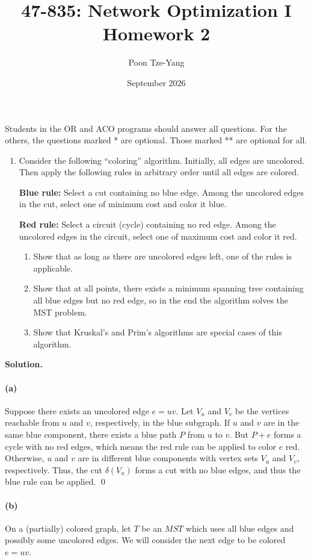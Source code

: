 \documentclass[11pt,letterpaper]{article}
\title{47-835: Network Optimization I \\ Homework 2}
\author{Poon Tze-Yang}
\date{September 2026}
\theoremstyle{definition}
\newcommand{\solution}{\medskip\noindent\textbf{Solution.}\par\medskip}
\begin{document}
\maketitle

Students in the OR and ACO programs should answer all questions. For the others, the questions marked * are optional. Those marked ** are optional for all.

\begin{enumerate}[series=q]
\item Consider the following ``coloring'' algorithm. Initially, all edges are uncolored. Then apply the following rules in arbitrary order until all edges are colored.

\noindent \textbf{Blue rule:} Select a cut containing no blue edge. Among the uncolored edges in the cut, select one of minimum cost and color it blue.

\noindent \textbf{Red rule:} Select a circuit (cycle) containing no red edge. Among the uncolored edges in the circuit, select one of maximum cost and color it red.
\begin{enumerate}
\item Show that as long as there are uncolored edges left, one of the rules is applicable.
\item Show that at all points, there exists a minimum spanning tree containing all blue edges but no red edge, so in the end the algorithm solves the MST problem.
\item Show that Kruskal's and Prim's algorithms are special cases of this algorithm.
\end{enumerate}
\end{enumerate}

\solution
 
\paragraph{(a)}
Suppose there exists an uncolored edge $e=uv$. 
Let $V_u$ and $V_v$ be the vertices reachable from $u$ and $v$, respectively, in the blue subgraph.
If $u$ and $v$ are in the same blue component, there exists a blue path $P$ from $u$ to $v$. 
But $P+e$ forms a cycle with no red edges, which means the red rule can be applied to color $e$ red.
Otherwise, $u$ and $v$ are in different blue components with vertex sets $V_u$ and $V_v$, respectively. 
Thus, the cut $\delta(V_u)$ forms a cut with no blue edges, and thus the blue rule can be applied.
\qed

\paragraph{(b)}
On a (partially) colored graph, let $T$ be an $MST$ which uses all blue edges and possibly some uncolored edges.
We will consider the next edge to be colored $e=uv$.
\end{document}
